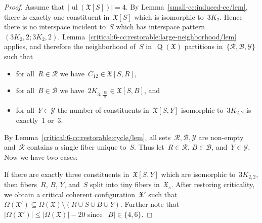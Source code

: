 \documentclass[english,a4paper]{article}
\theoremstyle{plain}
\theoremstyle{definition}
\newcommand{\abs}[1]{| #1 |}
\newcommand{\coherentConfig}{\ensuremath{\mathfrak{X}}}
\newcommand{\interspace}[2]{\ensuremath{\coherentConfig[#1,#2]}}
\newcommand{\inducedCC}[1]{\ensuremath{\coherentConfig[#1]}}
\DeclareMathOperator*{\ul}{ul}
\newcommand{\vertices}{\ensuremath{\Omega}}
\DeclareMathOperator*{\Quotient}{Q}
\newcommand{\quotientGraph}[1]{\ensuremath{\Quotient(#1)}}
\newcommand{\ipsixMatchingMatching}     {\ensuremath{(\disjointCliques{3}{2},2;\disjointCliques{3}{2},2)}}
\newcommand{\clique}[1]{\ensuremath{K_{#1}}}
\newcommand{\cycle}[1]{\ensuremath{C_{#1}}}
\newcommand{\disjointCliques}[2]{\ensuremath{#1 \clique{#2}}}
\begin{document}
\begin{proof}
    Assume that~$|\ul(\inducedCC{S})| = 4$.
    By Lemma~\ref{small-cc:induced-cc/lem}, there is exactly one constituent in~$\inducedCC{S}$ which is isomorphic to~$\disjointCliques{3}{2}$.
    Hence there is no interspace incident to~$S$ which has interspace pattern~$\ipsixMatchingMatching$.
    Lemma~\ref{critical:6-cc:restorable:large-neighborhood/lem} applies, and therefore the neighborhood of~$S$ in~$\quotientGraph{\coherentConfig}$ partitions in~$\{\mathcal{R},\mathcal{B},\mathcal{Y}\}$ such that
    \begin{itemize}
        \item
        for all~$R \in \mathcal{R}$ we have~$\cycle{12} \in \interspace{S}{R}$,
        \item
        for all~$B \in \mathcal{B}$ we have~$\disjointCliques{2}{3,\frac{\abs{B}}{2}} \in \interspace{S}{B}$, and
        \item
        for all~$Y \in \mathcal{Y}$ the number of constituents in~$\interspace{S}{Y}$ isomorphic to~$\disjointCliques{3}{2,2}$ is exactly~1 or~3.
    \end{itemize}
    By Lemma~\ref{critical:6-cc:restorable:cycle/lem}, all sets~$\mathcal{R}, \mathcal{B}, \mathcal{Y}$ are non-empty and~$\mathcal{R}$ contains a single fiber unique to~$S$.
    Thus let~$R\in\mathcal{R}$, $B \in \mathcal{B}$, and~$Y \in \mathcal{Y}$.
    Now we have two cases:

    If there are exactly three constituents in~$\interspace{S}{Y}$ which are isomorphic to~$\disjointCliques{3}{2,2}$, then fibers~$R$, $B$, $Y$, and~$S$ split into tiny fibers in~$\coherentConfig_s$.
    After restoring criticality, we obtain a critical coherent configuration~$\coherentConfig'$ such that~$\vertices(\coherentConfig') \subseteq \vertices(\coherentConfig) \setminus (R \cup S \cup B \cup Y)$.
    Further note that~$\abs{\vertices(\coherentConfig')} \leq \abs{\vertices(\coherentConfig)} - 20$ since~$\abs{B} \in \{4,6\}$.


\end{proof}
\end{document}
